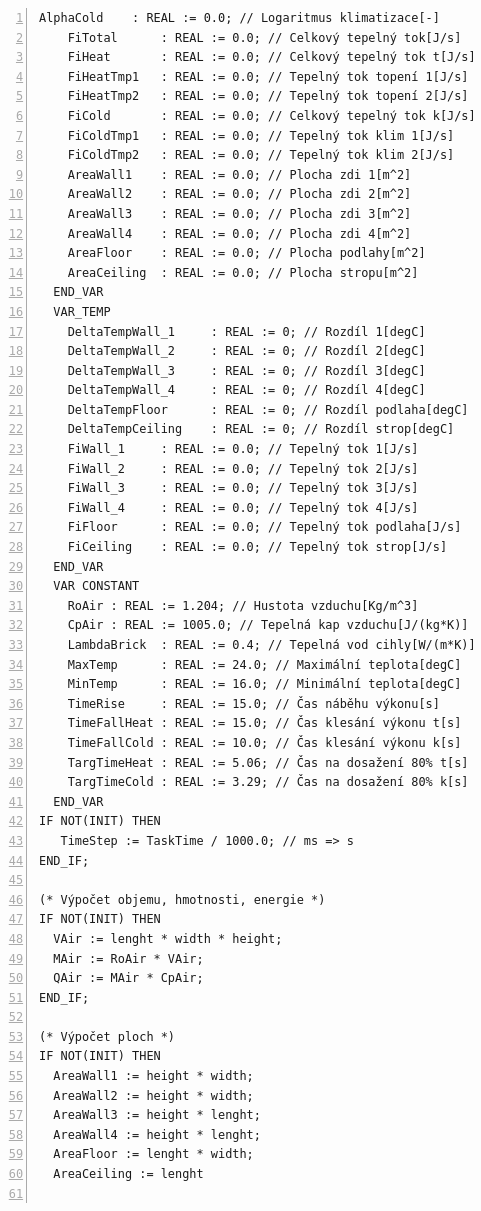 \begin{lstlisting}[language=ST, breaklines=true, numbers=left, numberstyle=\small, numbersep=10pt, frame=single, basicstyle=\ttfamily\small, caption={Definice funkčního bloku fbRoomTempMod}, label={lst:fbRoomTempMod}]
    AlphaCold    : REAL := 0.0; // Logaritmus klimatizace[-]
    FiTotal      : REAL := 0.0; // Celkový tepelný tok[J/s]
    FiHeat       : REAL := 0.0; // Celkový tepelný tok t[J/s]
    FiHeatTmp1   : REAL := 0.0; // Tepelný tok topení 1[J/s]
    FiHeatTmp2   : REAL := 0.0; // Tepelný tok topení 2[J/s]
    FiCold       : REAL := 0.0; // Celkový tepelný tok k[J/s]
    FiColdTmp1   : REAL := 0.0; // Tepelný tok klim 1[J/s]
    FiColdTmp2   : REAL := 0.0; // Tepelný tok klim 2[J/s]
    AreaWall1    : REAL := 0.0; // Plocha zdi 1[m^2]
    AreaWall2    : REAL := 0.0; // Plocha zdi 2[m^2]
    AreaWall3    : REAL := 0.0; // Plocha zdi 3[m^2]
    AreaWall4    : REAL := 0.0; // Plocha zdi 4[m^2]
    AreaFloor    : REAL := 0.0; // Plocha podlahy[m^2]
    AreaCeiling  : REAL := 0.0; // Plocha stropu[m^2]
  END_VAR
  VAR_TEMP
    DeltaTempWall_1     : REAL := 0; // Rozdíl 1[degC]
    DeltaTempWall_2     : REAL := 0; // Rozdíl 2[degC]
    DeltaTempWall_3     : REAL := 0; // Rozdíl 3[degC]
    DeltaTempWall_4     : REAL := 0; // Rozdíl 4[degC]
    DeltaTempFloor      : REAL := 0; // Rozdíl podlaha[degC]
    DeltaTempCeiling    : REAL := 0; // Rozdíl strop[degC]
    FiWall_1     : REAL := 0.0; // Tepelný tok 1[J/s]
    FiWall_2     : REAL := 0.0; // Tepelný tok 2[J/s]
    FiWall_3     : REAL := 0.0; // Tepelný tok 3[J/s]
    FiWall_4     : REAL := 0.0; // Tepelný tok 4[J/s]
    FiFloor      : REAL := 0.0; // Tepelný tok podlaha[J/s]
    FiCeiling    : REAL := 0.0; // Tepelný tok strop[J/s]
  END_VAR
  VAR CONSTANT
    RoAir : REAL := 1.204; // Hustota vzduchu[Kg/m^3]
    CpAir : REAL := 1005.0; // Tepelná kap vzduchu[J/(kg*K)]
    LambdaBrick  : REAL := 0.4; // Tepelná vod cihly[W/(m*K)]
    MaxTemp      : REAL := 24.0; // Maximální teplota[degC]
    MinTemp      : REAL := 16.0; // Minimální teplota[degC]
    TimeRise     : REAL := 15.0; // Čas náběhu výkonu[s]
    TimeFallHeat : REAL := 15.0; // Čas klesání výkonu t[s]
    TimeFallCold : REAL := 10.0; // Čas klesání výkonu k[s]
    TargTimeHeat : REAL := 5.06; // Čas na dosažení 80% t[s]
    TargTimeCold : REAL := 3.29; // Čas na dosažení 80% k[s]
  END_VAR
IF NOT(INIT) THEN
   TimeStep := TaskTime / 1000.0; // ms => s
END_IF;

(* Výpočet objemu, hmotnosti, energie *)
IF NOT(INIT) THEN
  VAir := lenght * width * height;
  MAir := RoAir * VAir;
  QAir := MAir * CpAir;
END_IF;

(* Výpočet ploch *)
IF NOT(INIT) THEN
  AreaWall1 := height * width;
  AreaWall2 := height * width;
  AreaWall3 := height * lenght;
  AreaWall4 := height * lenght;
  AreaFloor := lenght * width;
  AreaCeiling := lenght 
  

\end{lstlisting}
